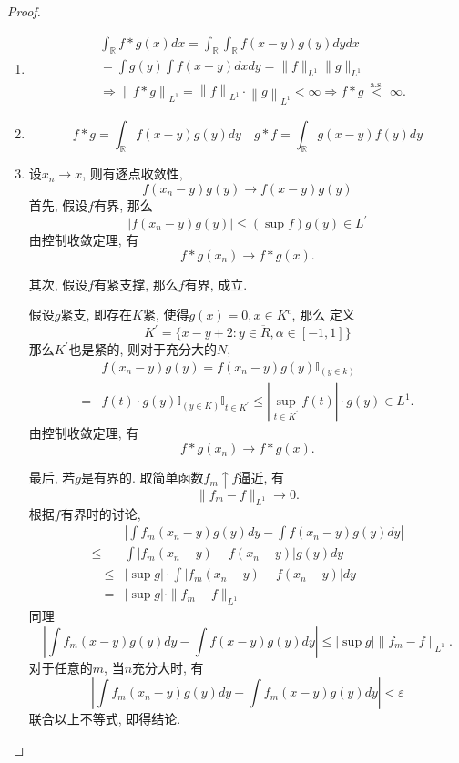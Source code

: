 \documentclass[UTF8, a4paper]{article}
\begin{document}
\begin{proof}
\begin{enumerate}
    \item $$
\begin{aligned}
& \int_{\mathbb{R}} f * g(x) d x=\int_{\mathbb{R}} \int_{\mathbb{R}} f(x-y) g(y) d y d x \\
& =\int g(y) \int f(x-y) d x d y=\|f\|_{L^{1}}\|g\|_{L^{1}} \\
& \Rightarrow \left\|f * g\right\|_{L^{1}}=\left\| f\right\|_{L^{1}}  \cdot\left\| g\right\|_{L^{1}} <\infty \Rightarrow f * g  \overset{\text { a.s. }}{<}\infty.
\end{aligned}
$$
\item $$
f * g=\int_{\mathbb{R}} f(x-y) g(y) d y \quad g * f=\int_{\mathbb{R}} g(x-y) f(y) d y
$$
\item 
设\(x_n \to x\), 则有逐点收敛性, 
$$
f\left(x_n-y\right) g(y) \rightarrow f(x-y) g(y)
$$
首先, 假设\(f\)有界, 那么
$$
\left|f\left(x_n-y\right) g(y)\right| \leqslant(\sup f) g(y) \in L^{\prime}
$$
由控制收敛定理, 有
$$
f*g(x_n) \to f*g(x).
$$

其次, 假设\(f\)有紧支撑, 那么\(f\)有界, 成立.

假设\(g\)紧支, 即存在\(K\)紧, 使得\(g(x) = 0, x \in K^c\), 那么
定义
$$
K^{\prime}=\overline{\{x-y+2: y \in R , \alpha \in[-1,1]\}}
$$
那么\(K^{\prime}\)也是紧的, 
则对于充分大的\(N\), 
$$
\begin{aligned}
& f\left(x_n-y\right) g(y)=f\left(x_n-y\right) g(y) \mathbb{I}_{(y \in k)} \\
= & f(t) \cdot g(y) \mathbb{I}_{(y \in K)} \mathbb{I}_{t \in K^{\prime}} \leqslant\left|\sup _{t \in K^{\prime}} f(t)\right| \cdot g(y) \in L^{1}.
\end{aligned}
$$
由控制收敛定理, 有
$$
f*g(x_n) \to f*g(x).
$$

最后, 若\(g\)是有界的. 
取简单函数\(f_m \uparrow f\)逼近, 
有 
$$
\|f_m - f\|_{L^1} \to 0.
$$
根据\(f\)有界时的讨论, 
$$
\begin{aligned}
& \left|\int f_m\left(x_n-y\right) g(y) d y-\int f\left(x_n-y\right) g(y) d y\right| \\
 \leqslant& \int\left|f_m\left(x_n-y\right)-f\left(x_n-y\right)\right| g(y) d y \\
 \quad \leqslant&|\sup g| \cdot \int\left|f_m\left(x_n-y\right)-f\left(x_n-y\right)\right| d y \\
 \quad=&|\sup g| \cdot \| f_m-f\|_{L^1}
\end{aligned}
$$
同理 
$$
\left|\int f_m(x-y) g(y) d y-\int f(x-y) g(y) d y\right| \leqslant|\sup g| \| f_m-f\|_{L^1} .
$$
对于任意的\(m\), 当\(n\)充分大时, 有
$$
\left|\int f_m\left(x_n-y\right) g(y) d y-\int f_m(x-y) g(y) d y\right|<\varepsilon
$$
联合以上不等式, 即得结论.
\end{enumerate}
\end{proof}
\end{document}
